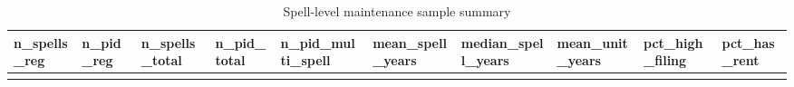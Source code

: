 \documentclass[
  11pt,
]{article}
\begin{document}
\begin{longtable}[]{@{}
  >{\raggedleft\arraybackslash}p{}
  >{\raggedleft\arraybackslash}p{}
  >{\raggedleft\arraybackslash}p{}
  >{\raggedleft\arraybackslash}p{}
  >{\raggedleft\arraybackslash}p{}
  >{\raggedleft\arraybackslash}p{}
  >{\raggedleft\arraybackslash}p{}
  >{\raggedleft\arraybackslash}p{}
  >{\raggedleft\arraybackslash}p{}
  >{\raggedleft\arraybackslash}p{}@{}}
\caption{Spell-level maintenance sample summary}\tabularnewline
\toprule\noalign{}
\begin{minipage}[b]{\linewidth}\raggedleft
n\_spells\_reg
\end{minipage} & \begin{minipage}[b]{\linewidth}\raggedleft
n\_pid\_reg
\end{minipage} & \begin{minipage}[b]{\linewidth}\raggedleft
n\_spells\_total
\end{minipage} & \begin{minipage}[b]{\linewidth}\raggedleft
n\_pid\_total
\end{minipage} & \begin{minipage}[b]{\linewidth}\raggedleft
n\_pid\_multi\_spell
\end{minipage} & \begin{minipage}[b]{\linewidth}\raggedleft
mean\_spell\_years
\end{minipage} & \begin{minipage}[b]{\linewidth}\raggedleft
median\_spell\_years
\end{minipage} & \begin{minipage}[b]{\linewidth}\raggedleft
mean\_unit\_years
\end{minipage} & \begin{minipage}[b]{\linewidth}\raggedleft
pct\_high\_filing
\end{minipage} & \begin{minipage}[b]{\linewidth}\raggedleft
pct\_has\_rent
\end{minipage} \\
\midrule\noalign{}
\endfirsthead
\toprule\noalign{}
\begin{minipage}[b]{\linewidth}\raggedleft

\end{minipage}
\end{longtable}
\end{document}
